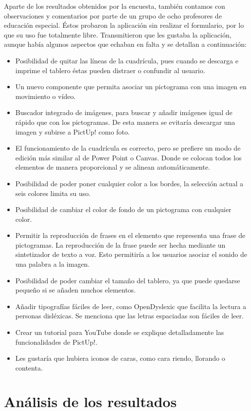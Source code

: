 Aparte de los resultados obtenidos por la encuesta, también contamos con observaciones y comentarios por parte de un grupo de ocho profesores de educación especial. Éstos probaron la aplicación sin realizar el formulario, por lo que su uso fue totalmente libre. Transmitieron que les gustaba la aplicación, aunque había algunos aspectos que echaban en falta y se detallan a continuación: 

\begin{itemize}
	\item Posibilidad de quitar las líneas de la cuadrícula, pues cuando se descarga e imprime el tablero éstas pueden distraer o confundir al usuario.  
	\item Un nuevo componente que permita asociar un pictograma con una imagen en movimiento o vídeo.
	\item Buscador integrado de imágenes, para buscar y añadir imágenes igual de rápido que con los pictogramas. De esta manera se evitaría descargar una imagen y subirse a PictUp! como foto. 
	\item El funcionamiento de la cuadrícula es correcto, pero se prefiere un modo de edición más similar al de Power Point o Canvas. Donde se colocan todos los elementos de manera proporcional y se alinean automáticamente.
	\item Posibilidad de poder poner cualquier color a los bordes, la selección actual a seis colores limita su uso.
	\item Posibilidad de cambiar el color de fondo de un pictograma con cualquier color. 
	\item Permitir la reproducción de frases en el elemento que representa una frase de pictogramas. La reproducción de la frase puede ser hecha mediante un sintetizador de texto a voz. Esto permitiría a los usuarios asociar el sonido de una palabra a la imagen.
	\item Posibilidad de poder cambiar el tamaño del tablero, ya que puede quedarse pequeño si se añaden muchos elementos.
	\item Añadir tipografías fáciles de leer, como OpenDyslexic que facilita la lectura a personas disléxicas. Se menciona que las letras espaciadas son fáciles de leer. 
	\item Crear un tutorial para YouTube donde se explique detalladamente las funcionalidades de PictUp!. 
	\item Les gustaría que hubiera iconos de caras, como cara riendo, llorando o contenta. 
\end{itemize}






\section{Análisis de los resultados}
\label{eva:analisis}

